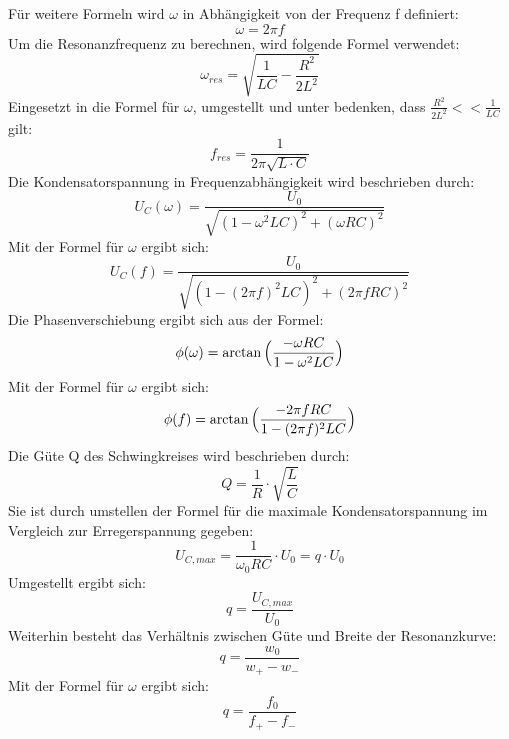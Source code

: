 \noindent
Für weitere Formeln wird $\omega$ in Abhängigkeit von der Frequenz f definiert:
\begin{equation}
    \omega = 2 \pi f
\end{equation}
Um die Resonanzfrequenz zu berechnen, wird folgende Formel verwendet\cite{v354}:
\begin{equation}
    \omega_{res} = \sqrt{\frac{1}{LC} - \frac{R^2}{2L^2}}
\end{equation}
Eingesetzt in die Formel für $\omega$, umgestellt und unter bedenken, dass $\frac{R^2}{2L^2} << \frac{1}{LC}$ gilt\cite{v354}:
\begin{equation}
    f_{res} = \frac{1}{2 \pi \sqrt{L \cdot C}}
\end{equation}
Die Kondensatorspannung in Frequenzabhängigkeit wird beschrieben durch\cite{v354}:
\begin{equation}
    U_C(\omega) = \frac{U_0}{\sqrt{(1 - \omega^2 L C)^2 + (\omega R C)^2}}
\end{equation}
Mit der Formel für $\omega$ ergibt sich:
\begin{equation}
    U_C(f) = \frac{U_0}{\sqrt{(1 - (2 \pi f)^2 L C)^2 + (2 \pi f R C)^2}}
\end{equation}
Die Phasenverschiebung ergibt sich aus der Formel\cite{v354}:
\begin{equation}
    \phi(\omega) = \arctan{\Bigl(\frac{-\omega R C}{1 - \omega^2 L C}\Bigr)}
\end{equation}
Mit der Formel für $\omega$ ergibt sich:
\begin{equation}
    \phi(f) = \arctan{\Bigl(\frac{-2 \pi f R C}{1 - (2 \pi f)^2 L C}\Bigr)}
\end{equation}
Die Güte Q des Schwingkreises wird beschrieben durch\cite{v354}:
\begin{equation}
     Q = \frac{1}{R} \cdot \sqrt{\frac{L}{C}}
\end{equation}  
Sie ist durch umstellen der Formel für die maximale Kondensatorspannung im Vergleich zur Erregerspannung gegeben\cite{v354}:
\begin{equation}
    U_{C,max} = \frac{1}{\omega_0 R C} \cdot U_0 = q \cdot U_0 
\end{equation}
Umgestellt ergibt sich:
\begin{equation}
    q = \frac{U_{C,max}}{U_0}
\end{equation}
Weiterhin besteht das Verhältnis zwischen Güte und Breite der Resonanzkurve\cite{v354}:
\begin{equation}
    q = \frac{w_{0}}{w_+ - w_-}
\end{equation}
Mit der Formel für $\omega$ ergibt sich:
\begin{equation}
    q = \frac{f_{0}}{f_+ - f_-}
\end{equation}